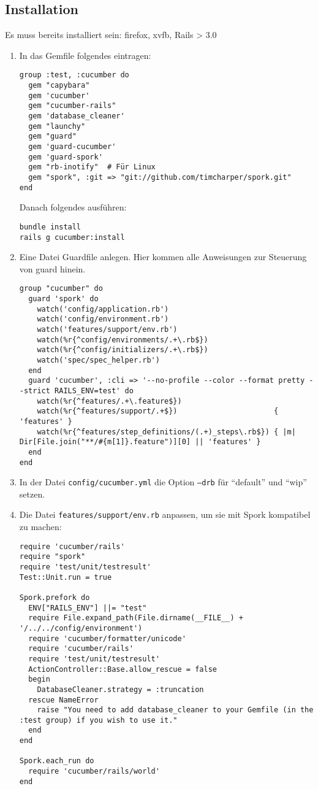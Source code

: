 \subsection*{Installation}
Es muss bereits installiert sein: firefox, xvfb, Rails > 3.0
\begin{enumerate}
 \item In das Gemfile folgendes eintragen:
 \begin{lstlisting}[caption=RAILS\_ROOT/Gemfile]
group :test, :cucumber do
  gem "capybara"
  gem 'cucumber'
  gem "cucumber-rails"
  gem 'database_cleaner'
  gem "launchy"
  gem "guard"
  gem 'guard-cucumber'
  gem 'guard-spork'
  gem "rb-inotify"  # Für Linux
  gem "spork", :git => "git://github.com/timcharper/spork.git"
end

 \end{lstlisting}
 Danach folgendes ausführen:

 \begin{verbatim}
bundle install
rails g cucumber:install
 \end{verbatim}


 \item Eine Datei Guardfile anlegen. Hier kommen alle Anweisungen zur Steuerung von guard hinein.
 \begin{lstlisting}[caption=RAILS\_ROOT/Guardfile]
group "cucumber" do
  guard 'spork' do
    watch('config/application.rb')
    watch('config/environment.rb')
    watch('features/support/env.rb')
    watch(%r{^config/environments/.+\.rb$})
    watch(%r{^config/initializers/.+\.rb$})
    watch('spec/spec_helper.rb')
  end
  guard 'cucumber', :cli => '--no-profile --color --format pretty --strict RAILS_ENV=test' do
    watch(%r{^features/.+\.feature$})
    watch(%r{^features/support/.+$})                      { 'features' }
    watch(%r{^features/step_definitions/(.+)_steps\.rb$}) { |m| Dir[File.join("**/#{m[1]}.feature")][0] || 'features' }
  end
end
\end{lstlisting}
\item In der Datei \texttt{config/cucumber.yml} die Option \texttt{--drb} für "`default"' und "`wip"' setzen.


\item Die Datei \texttt{features/support/env.rb} anpassen, um sie mit Spork kompatibel zu machen:
\begin{lstlisting}[caption=features/support/env.rb]
require 'cucumber/rails'
require "spork"
require 'test/unit/testresult'
Test::Unit.run = true

Spork.prefork do
  ENV["RAILS_ENV"] ||= "test"
  require File.expand_path(File.dirname(__FILE__) + '/../../config/environment')
  require 'cucumber/formatter/unicode'
  require 'cucumber/rails'
  require 'test/unit/testresult'
  ActionController::Base.allow_rescue = false
  begin
    DatabaseCleaner.strategy = :truncation
  rescue NameError
    raise "You need to add database_cleaner to your Gemfile (in the :test group) if you wish to use it."
  end
end

Spork.each_run do
  require 'cucumber/rails/world'
end

\end{lstlisting}

\end{enumerate}



